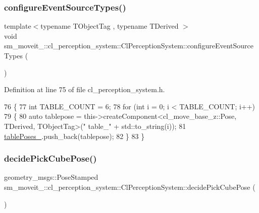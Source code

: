 \subsubsection{\texorpdfstring{configure\+Event\+Source\+Types()}{configureEventSourceTypes()}}
{\footnotesize\ttfamily template$<$typename T\+Object\+Tag , typename T\+Derived $>$ \\
void sm\+\_\+moveit\+\_\+::cl\+\_\+perception\+\_\+system\+::\+Cl\+Perception\+System\+::configure\+Event\+Source\+Types (\begin{DoxyParamCaption}{ }\end{DoxyParamCaption})\hspace{0.3cm}{\ttfamily [inline]}}



Definition at line 75 of file cl\+\_\+perception\+\_\+system.\+h.


\begin{DoxyCode}
76             \{
77                 \textcolor{keywordtype}{int} TABLE\_COUNT = 6;
78                 \textcolor{keywordflow}{for} (\textcolor{keywordtype}{int} i = 0; i < TABLE\_COUNT; i++)
79                 \{
80                     \textcolor{keyword}{auto} tablepose = this->createComponent<cl\_move\_base\_z::Pose, TDerived, TObjectTag>(\textcolor{stringliteral}{"
      table\_"} + std::to\_string(i));
81                     \hyperlink{classsm__moveit__4_1_1cl__perception__system_1_1ClPerceptionSystem_a3a1e9a71ee18c12bac7d76810c164996}{tablePoses\_}.push\_back(tablepose);
82                 \}
83             \}
\end{DoxyCode}
\mbox{\label{classsm__moveit__4_1_1cl__perception__system_1_1ClPerceptionSystem_ab4abc387e9053b62464a542378d779e5}} 
\subsubsection{\texorpdfstring{decide\+Pick\+Cube\+Pose()}{decidePickCubePose()}}
{\footnotesize\ttfamily geometry\+\_\+msgs\+::\+Pose\+Stamped sm\+\_\+moveit\+\_\+::cl\+\_\+perception\+\_\+system\+::\+Cl\+Perception\+System\+::decide\+Pick\+Cube\+Pose (\begin{DoxyParamCaption}{ }\end{DoxyParamCaption})\hspace{0.3cm}{\ttfamily [inline]}}



